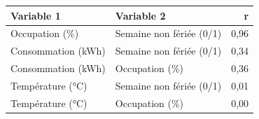 \begin{tabular}{llr}
\toprule
Variable 1 & Variable 2 & r \\
\midrule
Occupation (\%) & Semaine non fériée (0/1) & 0,96 \\
Consommation (kWh) & Semaine non fériée (0/1) & 0,34 \\
Consommation (kWh) & Occupation (\%) & 0,36 \\
Température (°C) & Semaine non fériée (0/1) & 0,01 \\
Température (°C) & Occupation (\%) & 0,00 \\
\bottomrule
\end{tabular}

